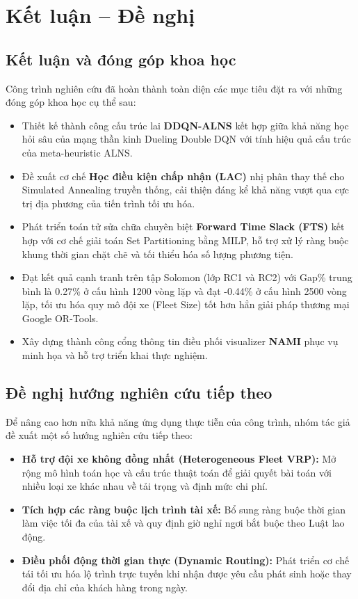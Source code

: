 \documentclass[13pt,a4paper]{extarticle}
\begin{document}
\section{Kết luận -- Đề nghị}
\subsection{Kết luận và đóng góp khoa học}

Công trình nghiên cứu đã hoàn thành toàn diện các mục tiêu đặt ra với những đóng góp khoa học cụ thể sau:
\begin{itemize}[leftmargin=1.2cm]
  \item Thiết kế thành công cấu trúc lai \textbf{DDQN-ALNS} kết hợp giữa khả năng học hỏi sâu của mạng thần kinh Dueling Double DQN với tính hiệu quả cấu trúc của meta-heuristic ALNS.
  \item Đề xuất cơ chế \textbf{Học điều kiện chấp nhận (LAC)} nhị phân thay thế cho Simulated Annealing truyền thống, cải thiện đáng kể khả năng vượt qua cực trị địa phương của tiến trình tối ưu hóa.
  \item Phát triển toán tử sửa chữa chuyên biệt \textbf{Forward Time Slack (FTS)} kết hợp với cơ chế giải toán Set Partitioning bằng MILP, hỗ trợ xử lý ràng buộc khung thời gian chặt chẽ và tối thiểu hóa số lượng phương tiện.
  \item Đạt kết quả cạnh tranh trên tập Solomon (lớp RC1 và RC2) với Gap\% trung bình là 0.27\% ở cấu hình 1200 vòng lặp và đạt -0.44\% ở cấu hình 2500 vòng lặp, tối ưu hóa quy mô đội xe (Fleet Size) tốt hơn hẳn giải pháp thương mại Google OR-Tools.
  \item Xây dựng thành công cổng thông tin điều phối visualizer \textbf{NAMI} phục vụ minh họa và hỗ trợ triển khai thực nghiệm.
\end{itemize}

\subsection{Đề nghị hướng nghiên cứu tiếp theo}

Để nâng cao hơn nữa khả năng ứng dụng thực tiễn của công trình, nhóm tác giả đề xuất một số hướng nghiên cứu tiếp theo:
\begin{itemize}[leftmargin=1.2cm]
  \item \textbf{Hỗ trợ đội xe không đồng nhất (Heterogeneous Fleet VRP):} Mở rộng mô hình toán học và cấu trúc thuật toán để giải quyết bài toán với nhiều loại xe khác nhau về tải trọng và định mức chi phí.
  \item \textbf{Tích hợp các ràng buộc lịch trình tài xế:} Bổ sung ràng buộc thời gian làm việc tối đa của tài xế và quy định giờ nghỉ ngơi bắt buộc theo Luật lao động.
  \item \textbf{Điều phối động thời gian thực (Dynamic Routing):} Phát triển cơ chế tái tối ưu hóa lộ trình trực tuyến khi nhận được yêu cầu phát sinh hoặc thay đổi địa chỉ của khách hàng trong ngày.
\end{itemize}
\end{document}
